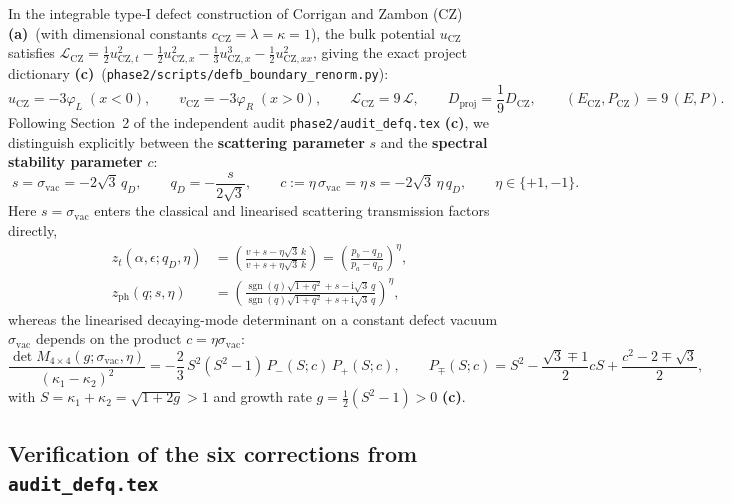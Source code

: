 \documentclass[11pt,a4paper]{article}
\theoremstyle{remark}
\newcommand{\ii}{\mathrm{i}}
\newcommand{\sgn}{\operatorname{sgn}}
\newcommand{\La}{\textbf{(a)}}
\newcommand{\Lc}{\textbf{(c)}}
\newcommand{\sren}{\texttt{phase2/\allowbreak scripts/\allowbreak defb\_\allowbreak boundary\_\allowbreak renorm.py}}
\begin{document}
In the integrable type-I defect construction of Corrigan and Zambon (CZ)
\cite{CZ} \La\ (with dimensional constants $c_{\mathrm{CZ}}=\lambda=\kappa=1$),
the bulk potential $u_{\mathrm{CZ}}$ satisfies
$\mathcal{L}_{\mathrm{CZ}} = \frac{1}{2}u_{\mathrm{CZ},t}^2 - \frac{1}{2}u_{\mathrm{CZ},x}^2 - \frac{1}{3}u_{\mathrm{CZ},x}^3 - \frac{1}{2}u_{\mathrm{CZ},xx}^2$,
giving the exact project dictionary \Lc\ (\sren):
\begin{equation}\label{eq:cz_dict}
  u_{\mathrm{CZ}} = -3\varphi_L \;(x<0), \qquad
  v_{\mathrm{CZ}} = -3\varphi_R \;(x>0), \qquad
  \mathcal{L}_{\mathrm{CZ}} = 9\,\mathcal{L}, \qquad
  D_{\mathrm{proj}} = \frac{1}{9}D_{\mathrm{CZ}}, \qquad
  (E_{\mathrm{CZ}},P_{\mathrm{CZ}}) = 9\,(E,P).
\end{equation}
Following Section~2 of the independent audit \texttt{phase2/audit\_defq.tex}
\Lc, we distinguish explicitly between the \textbf{scattering parameter} $s$ and
the \textbf{spectral stability parameter} $c$:
\begin{equation}\label{eq:sc_dict}
  \boxed{\;
  s = \sigma_{\mathrm{vac}} = -2\sqrt{3}\,q_D, \qquad
  q_D = -\frac{s}{2\sqrt{3}}, \qquad
  c := \eta\,\sigma_{\mathrm{vac}} = \eta\,s = -2\sqrt{3}\,\eta\,q_D, \qquad
  \eta \in \{+1,-1\}.
  \;}
\end{equation}
Here $s = \sigma_{\mathrm{vac}}$ enters the classical and linearised scattering
transmission factors directly,
\begin{align}
  z_t(\alpha,\epsilon;q_D,\eta) &= \left(\frac{v + s - \eta\sqrt{3}\,k}{v + s + \eta\sqrt{3}\,k}\right)
  = \left(\frac{p_b - q_D}{p_a - q_D}\right)^\eta, \label{eq:zt_sol}\\
  z_{\mathrm{ph}}(q;s,\eta) &= \left(\frac{\sgn(q)\sqrt{1+q^2} + s - \ii\sqrt{3}\,q}{\sgn(q)\sqrt{1+q^2} + s + \ii\sqrt{3}\,q}\right)^\eta, \label{eq:zph_phonon}
\end{align}
whereas the linearised decaying-mode determinant on a constant defect vacuum
$\sigma_{\mathrm{vac}}$ depends on the product $c = \eta\sigma_{\mathrm{vac}}$:
\begin{equation}\label{eq:det_c}
  \frac{\det M_{4\times 4}(g;\sigma_{\mathrm{vac}},\eta)}{(\kappa_1-\kappa_2)^2}
  = -\frac{2}{3}\,S^2(S^2-1)\,P_-(S;c)\,P_+(S;c), \qquad
  P_\mp(S;c) = S^2 - \frac{\sqrt{3}\mp 1}{2}cS + \frac{c^2-2\mp\sqrt{3}}{2},
\end{equation}
with $S = \kappa_1+\kappa_2 = \sqrt{1+2g} > 1$ and growth rate
$g = \frac{1}{2}(S^2-1) > 0$ \Lc.

\subsection{Verification of the six corrections from \texttt{audit\_defq.tex}}
\end{document}
